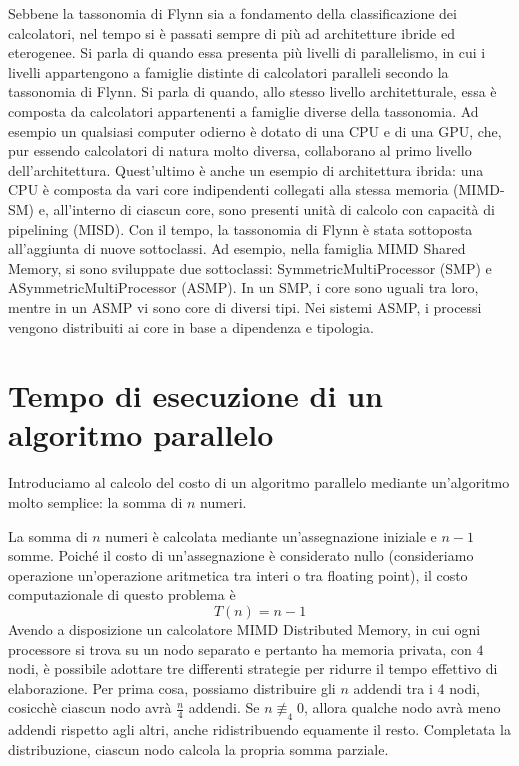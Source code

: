 Sebbene la tassonomia di Flynn sia a fondamento della classificazione dei calcolatori, nel tempo si è passati sempre di più ad architetture ibride ed eterogenee. Si parla di  quando essa presenta più livelli di parallelismo, in cui i livelli appartengono a famiglie distinte di calcolatori paralleli secondo la tassonomia di Flynn.
Si parla di  quando, allo stesso livello architetturale, essa è composta da calcolatori appartenenti a famiglie diverse della tassonomia. Ad esempio un qualsiasi computer odierno è dotato di una CPU e di una GPU, che, pur essendo calcolatori di natura molto diversa, collaborano al primo livello dell'architettura.
Quest'ultimo è anche un esempio di architettura ibrida: una CPU è composta da vari core indipendenti collegati alla stessa memoria (MIMD-SM) e, all'interno di ciascun core, sono presenti unità di calcolo con capacità di pipelining (MISD).
Con il tempo, la tassonomia di Flynn è stata sottoposta all'aggiunta di nuove sottoclassi. Ad esempio, nella famiglia MIMD Shared Memory, si sono sviluppate due sottoclassi: SymmetricMultiProcessor (SMP) e ASymmetricMultiProcessor (ASMP).
In un SMP, i core sono uguali tra loro, mentre in un ASMP vi sono core di diversi tipi. Nei sistemi ASMP, i processi vengono distribuiti ai core in base a dipendenza e tipologia.

\section{Tempo di esecuzione di un algoritmo parallelo}
Introduciamo al calcolo del costo di un algoritmo parallelo mediante un'algoritmo molto semplice: la somma di $n$ numeri.

La somma di $n$ numeri è calcolata mediante un'assegnazione iniziale e $n-1$ somme. Poiché il costo di un'assegnazione è considerato nullo (consideriamo operazione un'operazione aritmetica tra interi o tra floating point), il costo computazionale di questo problema è
$$T(n)= n-1$$
Avendo a disposizione un calcolatore MIMD Distributed Memory, in cui ogni processore si trova su un nodo separato e pertanto ha memoria privata, con $4$ nodi, è possibile adottare tre differenti strategie per ridurre il tempo effettivo di elaborazione.
Per prima cosa, possiamo distribuire gli $n$ addendi tra i $4$ nodi, cosicchè ciascun nodo avrà $\frac{n}{4}$ addendi. Se $n\not\equiv_{4}0$, allora qualche nodo avrà meno addendi rispetto agli altri, anche ridistribuendo equamente il resto. 
Completata la distribuzione, ciascun nodo calcola la propria somma parziale. 

